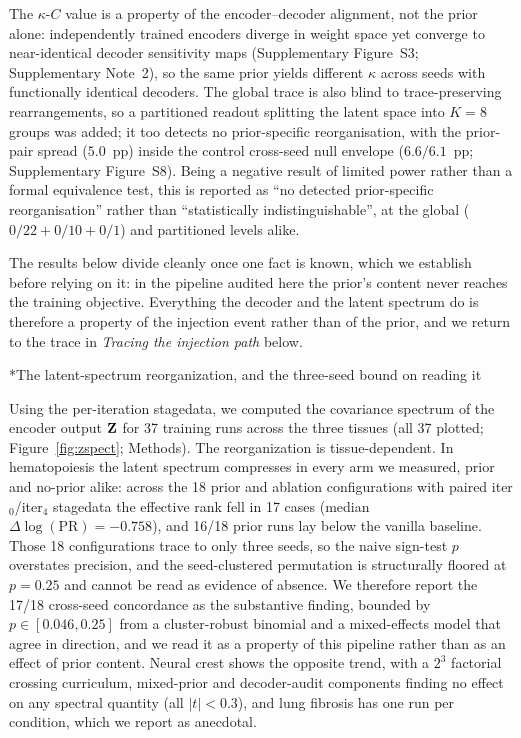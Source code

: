 \documentclass[11pt,a4paper]{article}
\makeatletter
\renewcommand{\subsection}{\@startsection{subsection}{2}{0pt}{10pt plus 4pt}{4pt}{\normalsize\bfseries}}
\makeatother
\begin{document}
The $\kappa$-$C$ value is a property of the encoder--decoder alignment, not the prior alone: independently trained encoders diverge in weight space yet converge to near-identical decoder sensitivity maps (Supplementary Figure~S3; Supplementary Note~2), so the same prior yields different $\kappa$ across seeds with functionally identical decoders. The global trace is also blind to trace-preserving rearrangements, so a partitioned readout splitting the latent space into $K=8$ groups was added; it too detects no prior-specific reorganisation, with the prior-pair spread ($5.0$~pp) inside the control cross-seed null envelope ($6.6/6.1$~pp; Supplementary Figure~S8). Being a negative result of limited power rather than a formal equivalence test, this is reported as ``no detected prior-specific reorganisation'' rather than ``statistically indistinguishable'', at the global ($0/22 + 0/10 + 0/1$) and partitioned levels alike.

The results below divide cleanly once one fact is known, which we establish before relying on it: in the pipeline audited here the prior's content never reaches the training objective. Everything the decoder and the latent spectrum do is therefore a property of the injection event rather than of the prior, and we return to the trace in \emph{Tracing the injection path} below.

\subsection*{The latent-spectrum reorganization, and the three-seed bound on reading it}

Using the per-iteration stagedata, we computed the covariance spectrum of the encoder
output $\mathbf{Z}$ for 37 training runs across the three tissues (all 37 plotted;
Figure~\ref{fig:zspect}; Methods). The reorganization is tissue-dependent. In
hematopoiesis the latent spectrum compresses in every arm we measured, prior and
no-prior alike: across the 18 prior and ablation configurations with paired
iter$_0$/iter$_4$ stagedata the effective rank fell in 17 cases (median
$\Delta\log(\mathrm{PR})=-0.758$), and 16/18 prior runs lay below the vanilla baseline.
Those 18 configurations trace to only three seeds, so the naive sign-test $p$
overstates precision, and the seed-clustered permutation is structurally floored at
$p=0.25$ and cannot be read as evidence of absence. We therefore report the 17/18
cross-seed concordance as the substantive finding, bounded by $p\in[0.046,0.25]$ from a
cluster-robust binomial and a mixed-effects model that agree in direction, and we read
it as a property of this pipeline rather than as an effect of prior content. Neural
crest shows the opposite trend, with a $2^3$ factorial crossing curriculum, mixed-prior
and decoder-audit components finding no effect on any spectral quantity (all $|t|<0.3$),
and lung fibrosis has one run per condition, which we report as anecdotal.
\end{document}

